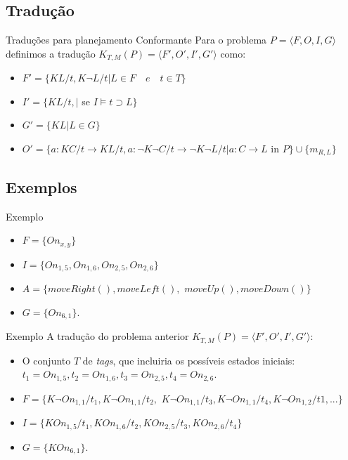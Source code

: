 \subsection{Tradução}
\begin{frame}{Traduções para planejamento Conformante}
Para o problema $P=\langle F, O, I, G\rangle$ definimos a tradução $K_{T,M}(P) = 
\langle F', O', I', G'\rangle$ como:
\begin{itemize}
\item $F' = \lbrace KL/t, K\lnot L/t \vert L \in F \quad e \quad t \in T 
\rbrace$
\item $I' = \lbrace KL/t, \vert$ se $I \models t \supset L  \rbrace$ 
\item $G' = \lbrace KL \vert L \in G \rbrace$
\item $O' = \lbrace a: KC/t \rightarrow KL/t, a: \lnot K \lnot C / t \rightarrow 
\lnot K \lnot L/t \vert a: C \rightarrow L$ in $P \rbrace \cup \lbrace m_{R,L} 
\rbrace$ 
\end{itemize}
\end{frame}

\subsection{Exemplos}
\begin{frame}{Exemplo}
    \begin{multicols}{2}
        \centering
        
    \columnbreak
        \begin{itemize}
        \item $F = \lbrace On_{x,y} \rbrace$
        \item $I=\lbrace On_{1,5}, On_{1,6}, On_{2,5}, On_{2,6} \rbrace$
        \item $A=\lbrace moveRight(), moveLeft(),$ $moveUp(), moveDown() 
\rbrace$
        \item $G=\lbrace On_{6,1}\rbrace$.
        \end{itemize} 
    \end{multicols}
\end{frame}

\begin{frame}{Exemplo}
    A tradução do problema anterior $K_{T,M}(P) = \langle F', O', I', 
G'\rangle$:
    \begin{itemize}
    \item O conjunto $T$ de \textit{tags}, que incluiria os possíveis estados 
iniciais: 
    $t_1 = On_{1,5}, t_2 = On_{1,6}, t_3 = On_{2,5}, t_4 = On_{2,6}$.
    \item $F = \lbrace  K \lnot On_{1,1} / t_1, K \lnot On_{1,1} / t_2,$ 
    $ K \lnot On_{1,1} / t_3, K \lnot On_{1,1} / t_4, K \lnot On_{1,2} / t1,... 
\rbrace$
    \item $I=\lbrace K On_{1,5}/t_1, K On_{1,6}/t_2, K On_{2,5}/ t_3, K 
On_{2,6}/ t_4 \rbrace$
    \item $G=\lbrace K On_{6,1}\rbrace$.
    \end{itemize}
\end{frame}



